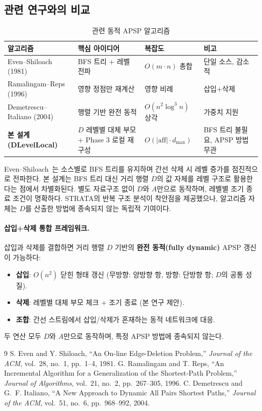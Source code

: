 \documentclass[11pt,a4paper]{article}
\begin{document}
\subsection{관련 연구와의 비교}

\begin{table}[H]\centering
\caption{관련 동적 APSP 알고리즘}
\small
\begin{tabular}{@{}llll@{}}
\toprule
\textbf{알고리즘} & \textbf{핵심 아이디어} & \textbf{복잡도} & \textbf{비고} \\
\midrule
Even--Shiloach (1981) & BFS 트리 + 레벨 전파 & $O(m \cdot n)$ 총합 & 단일 소스, 감소적 \\
Ramalingam--Reps (1996) & 영향 정점만 재계산 & 영향 비례 & 삽입+삭제 \\
Demetrescu--Italiano (2004) & 행렬 기반 완전 동적 & $O(n^2 \log^3 n)$ 상각 & 가중치 지원 \\
\midrule
\textbf{본 설계 (DLevelLocal)} & $D$ 레벨별 대체 부모 + Phase 3 로컬 재구성 & $O(|\mathrm{aff}| \cdot d_{\max})$ & BFS 트리 불필요, APSP 방법 무관 \\
\bottomrule
\end{tabular}
\end{table}

Even--Shiloach~\cite{even1981}는 소스별로 BFS 트리를 유지하며 간선 삭제 시 레벨 증가를 점진적으로 전파한다. 본 설계는 BFS 트리 대신 거리 행렬 $D$의 값 자체를 레벨 구조로 활용한다는 점에서 차별화된다. 별도 자료구조 없이 $D$와 $A$만으로 동작하며, 레벨별 조기 종료 조건이 명확하다. STRATA의 반복 구조 분석이 착안점을 제공했으나, 알고리즘 자체는 $D$를 산출한 방법에 종속되지 않는 독립적 기여이다.

\paragraph{삽입+삭제 통합 프레임워크.}
삽입과 삭제를 결합하면 거리 행렬 $D$ 기반의 \textbf{완전 동적(fully dynamic)} APSP 갱신이 가능하다:
\begin{itemize}[leftmargin=1.4em]
  \item \textbf{삽입}: $O(n^2)$ 닫힌 형태 갱신 (무방향: 양방향 항, 방향: 단방향 항; $D$의 공통 성질).
  \item \textbf{삭제}: 레벨별 대체 부모 체크 + 조기 종료 (본 연구 제안).
  \item \textbf{조합}: 간선 스트림에서 삽입/삭제가 혼재하는 동적 네트워크에 대응.
\end{itemize}
두 연산 모두 $D$와 $A$만으로 동작하며, 특정 APSP 방법에 종속되지 않는다.

\begin{thebibliography}{9}
 S. Even and Y. Shiloach, ``An On-line Edge-Deletion Problem,'' \textit{Journal of the ACM}, vol.~28, no.~1, pp.~1--4, 1981.
 G. Ramalingam and T. Reps, ``An Incremental Algorithm for a Generalization of the Shortest-Path Problem,'' \textit{Journal of Algorithms}, vol.~21, no.~2, pp.~267--305, 1996.
 C. Demetrescu and G.~F. Italiano, ``A New Approach to Dynamic All Pairs Shortest Paths,'' \textit{Journal of the ACM}, vol.~51, no.~6, pp.~968--992, 2004.
\end{thebibliography}
\end{document}
